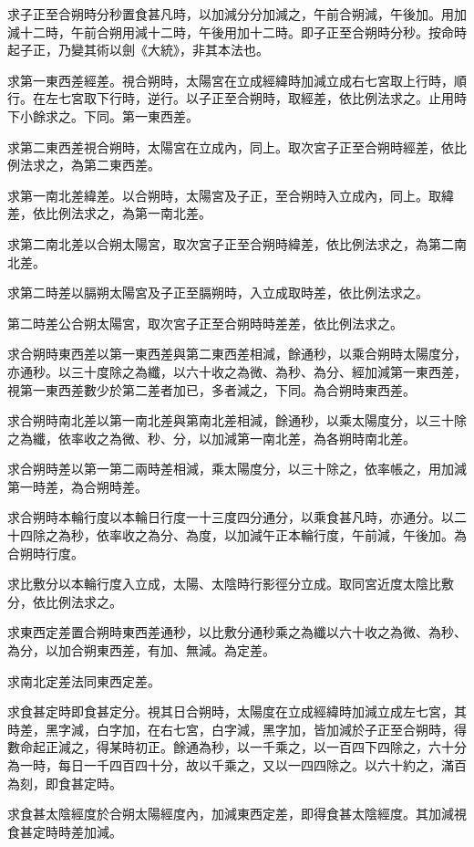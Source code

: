 求子正至合朔時分秒置食甚凡時，以加減分分加減之，午前合朔減，午後加。用加減十二時，午前合朔用減十二時，午後用加十二時。即子正至合朔時分秒。按命時起子正，乃變其術以劍《大統》，非其本法也。

求第一東西差經差。視合朔時，太陽宮在立成經緯時加減立成右七宮取上行時，順行。在左七宮取下行時，逆行。以子正至合朔時，取經差，依比例法求之。止用時下小餘求之。下同。第一東西差。

求第二東西差視合朔時，太陽宮在立成內，同上。取次宮子正至合朔時經差，依比例法求之，為第二東西差。

求第一南北差緯差。以合朔時，太陽宮及子正，至合朔時入立成內，同上。取緯差，依比例法求之，為第一南北差。

求第二南北差以合朔太陽宮，取次宮子正至合朔時緯差，依比例法求之，為第二南北差。

求第二時差以膈朔太陽宮及子正至膈朔時，入立成取時差，依比例法求之。

第二時差公合朔太陽宮，取次宮子正至合朔時時差差，依比例法求之。

求合朔時東西差以第一東西差與第二東西差相減，餘通秒，以乘合朔時太陽度分，亦通秒。以三十度除之為纖，以六十收之為微、為秒、為分、經加減第一東西差，視第一東西差數少於第二差者加已，多者減之，下同。為合朔時東西差。

求合朔時南北差以第一南北差與第南北差相減，餘通秒，以乘太陽度分，以三十除之為纖，依率收之為微、秒、分，以加減第一南北差，為各朔時南北差。

求合朔時差以第一第二兩時差相減，乘太陽度分，以三十除之，依率帳之，用加減第一時差，為合朔時差。

求合朔時本輪行度以本輪日行度一十三度四分通分，以乘食甚凡時，亦通分。以二十四除之為秒，依率收之為分、為度，以加減午正本輪行度，午前減，午後加。為合朔時行度。

求比敷分以本輪行度入立成，太陽、太陰時行影徑分立成。取同宮近度太陰比敷分，依比例法求之。

求東西定差置合朔時東西差通秒，以比敷分通秒乘之為纖以六十收之為微、為秒、為分，以加合朔東西差，有加、無減。為定差。

求南北定差法同東西定差。

求食甚定時即食甚定分。視其日合朔時，太陽度在立成經緯時加減立成左七宮，其時差，黑字減，白字加，在右七宮，白字減，黑字加，皆加減於子正至合朔時，得數命起正減之，得某時初正。餘通為秒，以一千乘之，以一百四下四除之，六十分為一時，每日一千四百四十分，故以千乘之，又以一四四除之。以六十約之，滿百為刻，即食甚定時。

求食甚太陰經度於合朔太陽經度內，加減東西定差，即得食甚太陰經度。其加減視食甚定時時差加減。

